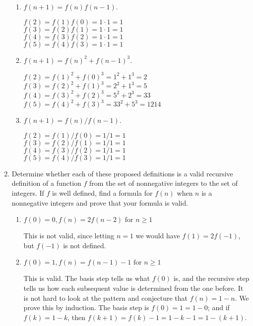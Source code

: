\documentclass[11pt]{article}
\begin{document}
\begin{enumerate}[label=\textbf{\arabic*.}]
\begin{enumerate}[label=\textbf{\alph*)}]
		\item $f(n + 1) = f(n)f(n - 1)$.
		
		$f(2) = f(1)f(0) = 1 \cdot 1 = 1$ \\
		$f(3) = f(2)f(1) = 1 \cdot 1 = 1$ \\
		$f(4) = f(3)f(2) = 1 \cdot 1 = 1$ \\
		$f(5) = f(4)f(3) = 1 \cdot 1 = 1$
		
		\item $f(n + 1) = f(n)^2 + f(n - 1)^3$.
		
		$f(2) = f(1)^2 + f(0)^3 = 1^2 + 1^3 = 2$ \\
		$f(3) = f(2)^2 + f(1)^3 = 2^2 + 1^3 = 5$ \\
		$f(4) = f(3)^2 + f(2)^3 = 5^2 + 2^3 = 33$ \\
		$f(5) = f(4)^2 + f(3)^3 = 33^2 + 5^3 = 1214$
		
		\item $f(n + 1) = f(n) / f(n - 1)$.
		
		$f(2) = f(1) / f(0) = 1 / 1 = 1$ \\
		$f(3) = f(2) / f(1) = 1 / 1 = 1$ \\
		$f(4) = f(3) / f(2) = 1 / 1 = 1$ \\
		$f(5) = f(4) / f(3) = 1 / 1 = 1$
	\end{enumerate}

	\item Determine whether each of these proposed definitions is a valid recursive definition of a function $f$ from the set of nonnegative integers to the set of integers. If $f$ is well defined, find a formula for $f(n)$ when $n$ is a nonnegative integers and prove that your formula is valid.
	
	\begin{enumerate}[label=\textbf{\alph*)}]
		\item $f(0) = 0, f(n) = 2f(n - 2) \text{ for } n \geq 1$
		
		This is not valid, since letting $n = 1$ we would have $f(1) = 2f(-1)$, but $f(-1)$ is not defined.
		
		\item $f(0) = 1, f(n) = f(n - 1) - 1 \text{ for } n \geq 1$
		
		This is valid. The basis step tells us what $f(0)$ is, and the recursive step tells us how each subsequent value is determined from the one before. It is not hard to look at the pattern and conjecture that $f(n) = 1 - n$. We prove this by induction. The basis step is $f(0) = 1 = 1 - 0$; and if $f(k) = 1 - k$, then $f(k + 1) = f(k) - 1 = 1 - k - 1 = 1 - (k + 1)$.
		

\end{enumerate}
\end{enumerate}
\end{document}

